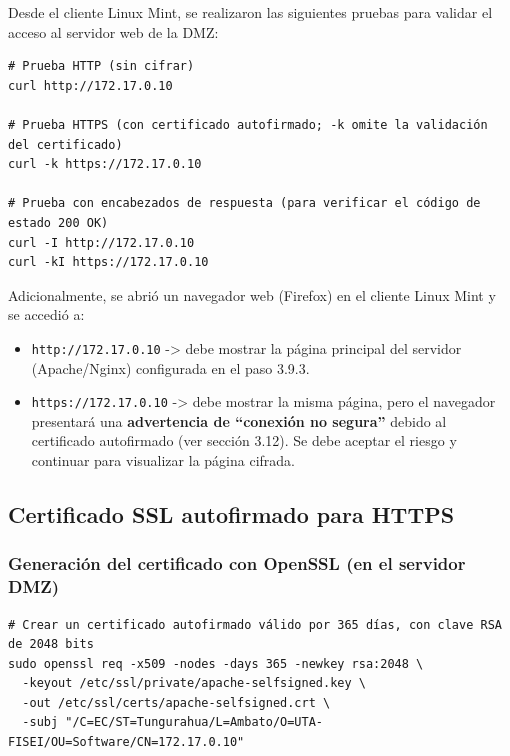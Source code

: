 \documentclass{article}
\providecommand{\tightlist}{%
  \setlength{\itemsep}{0pt}\setlength{\parskip}{0pt}}
\renewcommand{\_}{\oldunderscore\hskip0pt\relax}
\begin{document}
Desde el cliente Linux Mint, se realizaron las siguientes pruebas para
validar el acceso al servidor web de la DMZ:

\begin{Verbatim}[fontsize=\footnotesize,frame=single,rulecolor=\color{codebg},fillcolor=\color{codebg},framesep=2mm,xleftmargin=1mm,xrightmargin=1mm,breaklines=true,breakanywhere=true,breaksymbolleft={},breaksymbolright={}]
# Prueba HTTP (sin cifrar)
curl http://172.17.0.10

# Prueba HTTPS (con certificado autofirmado; -k omite la validación del certificado)
curl -k https://172.17.0.10

# Prueba con encabezados de respuesta (para verificar el código de estado 200 OK)
curl -I http://172.17.0.10
curl -kI https://172.17.0.10
\end{Verbatim}

Adicionalmente, se abrió un navegador web (Firefox) en el cliente Linux
Mint y se accedió a:

\begin{itemize}
\tightlist
\item
  \texttt{http://172.17.0.10} -\textgreater{} debe mostrar la página
  principal del servidor (Apache/Nginx) configurada en el paso 3.9.3.
\item
  \texttt{https://172.17.0.10} -\textgreater{} debe mostrar la misma
  página, pero el navegador presentará una \textbf{advertencia de
  ``conexión no segura''} debido al certificado autofirmado (ver sección
  3.12). Se debe aceptar el riesgo y continuar para visualizar la página
  cifrada.
\end{itemize}

\hypertarget{certificado-ssl-autofirmado-para-https}{%
\subsection{Certificado SSL autofirmado para
HTTPS}\label{certificado-ssl-autofirmado-para-https}}

\hypertarget{generaciuxf3n-del-certificado-con-openssl-en-el-servidor-dmz}{%
\subsubsection{Generación del certificado con OpenSSL (en el servidor
DMZ)}\label{generaciuxf3n-del-certificado-con-openssl-en-el-servidor-dmz}}

\begin{Verbatim}[fontsize=\footnotesize,frame=single,rulecolor=\color{codebg},fillcolor=\color{codebg},framesep=2mm,xleftmargin=1mm,xrightmargin=1mm,breaklines=true,breakanywhere=true,breaksymbolleft={},breaksymbolright={}]
# Crear un certificado autofirmado válido por 365 días, con clave RSA de 2048 bits
sudo openssl req -x509 -nodes -days 365 -newkey rsa:2048 \
  -keyout /etc/ssl/private/apache-selfsigned.key \
  -out /etc/ssl/certs/apache-selfsigned.crt \
  -subj "/C=EC/ST=Tungurahua/L=Ambato/O=UTA-FISEI/OU=Software/CN=172.17.0.10"
\end{Verbatim}
\end{document}
